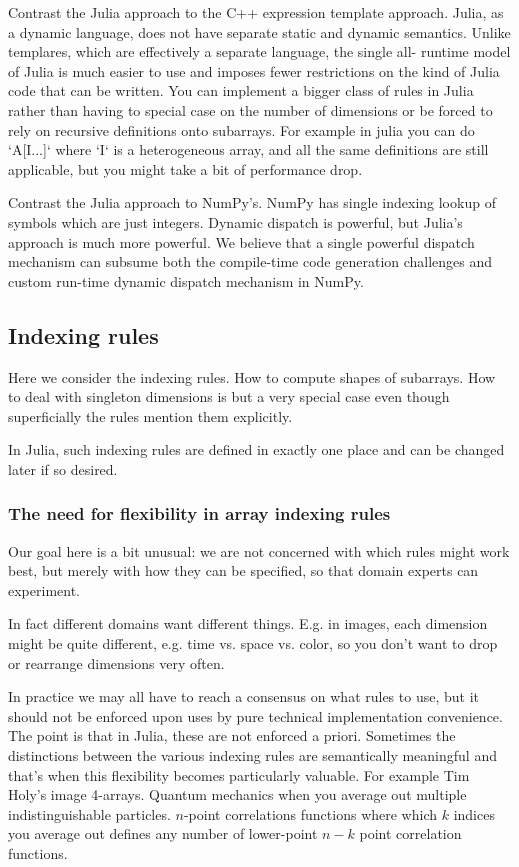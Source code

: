 \documentclass[preprint]{sigplanconf}
\begin{document}
Contrast the Julia approach to the C++ expression template approach. Julia, as
a dynamic language, does not have separate static and dynamic semantics.
Unlike templares, which are effectively a separate language, the single all-
runtime model of Julia is much easier to use and imposes fewer restrictions on
the kind of Julia code that can be written. You can implement a bigger class
of rules in Julia rather than having to special case on the number of
dimensions or be forced to rely on recursive definitions onto subarrays. For
example in julia you can do `A[I...]` where `I` is a heterogeneous array, and
all the same definitions are still applicable, but you might take a bit of
performance drop.

Contrast the Julia approach to NumPy's. NumPy has single indexing lookup of
symbols which are just integers. Dynamic dispatch is powerful, but Julia's
approach is much more powerful. We believe that a single powerful dispatch
mechanism can subsume both the compile-time code generation challenges and
custom run-time dynamic dispatch mechanism in NumPy.

\subsection{Indexing rules}

Here we consider the indexing rules. How to compute shapes of subarrays. How
to deal with singleton dimensions is but a very special case even though
superficially the rules mention them explicitly.

In Julia, such indexing rules are defined in exactly one place and can be
changed later if so desired.

\subsubsection{The need for flexibility in array indexing rules}

Our goal here is a bit unusual: we are not concerned with which rules might
work best, but merely with how they can be specified, so that domain experts
can experiment.

In fact different domains want different things. E.g. in images, each
dimension might be quite different, e.g. time vs. space vs. color, so you
don't want to drop or rearrange dimensions very often.

In practice we may all have to reach a consensus on what rules to use, but it
should not be enforced upon uses by pure technical implementation convenience.
The point is that in Julia, these are not enforced a priori. Sometimes the
distinctions between the various indexing rules are semantically meaningful
and that's when this flexibility becomes particularly valuable. For example
Tim Holy's image 4-arrays. Quantum mechanics when you average out multiple
indistinguishable particles. $n$-point correlations functions where which $k$
indices you average out defines any number of lower-point $n-k$ point
correlation functions.
\end{document}
